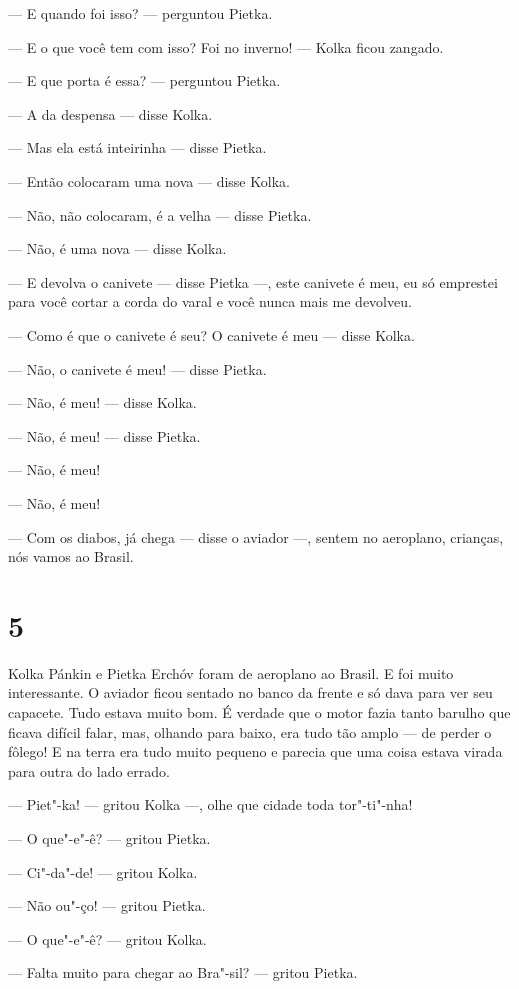 --- E quando foi isso? --- perguntou Pietka.

--- E o que você tem com isso? Foi no inverno! --- Kolka ficou zangado.

--- E que porta é essa? --- perguntou Pietka.

--- A da despensa --- disse Kolka.

--- Mas ela está inteirinha --- disse Pietka.

--- Então colocaram uma nova --- disse Kolka.

--- Não, não colocaram, é a velha --- disse Pietka.

--- Não, é uma nova --- disse Kolka.

--- E devolva o canivete --- disse Pietka ---, este canivete é meu,
eu só emprestei para você cortar a corda do varal e você nunca mais me
devolveu.

--- Como é que o canivete é seu? O canivete é meu --- disse Kolka.

--- Não, o canivete é meu! --- disse Pietka.

--- Não, é meu! --- disse Kolka.

--- Não, é meu! --- disse Pietka.

--- Não, é meu!

--- Não, é meu!

--- Com os diabos, já chega --- disse o aviador ---, sentem no
aeroplano, crianças, nós vamos ao Brasil.

\section{5}

Kolka Pánkin e Pietka Erchóv foram de aeroplano ao Brasil. E foi muito
interessante. O aviador ficou sentado no banco da frente e só dava para
ver seu capacete. Tudo estava muito bom. É verdade que o motor fazia
tanto barulho que ficava difícil falar, mas, olhando para baixo, era
tudo tão amplo --- de perder o fôlego! E na terra era tudo muito pequeno e
parecia que uma coisa estava virada para outra do lado errado.

--- Piet"-ka! --- gritou Kolka ---, olhe que cidade toda tor"-ti"-nha!

--- O que"-e"-ê? --- gritou Pietka.

--- Ci"-da"-de! --- gritou Kolka.

--- Não ou"-ço! --- gritou Pietka.

--- O que"-e"-ê? --- gritou Kolka.

--- Falta muito para chegar ao Bra"-sil? --- gritou Pietka.

